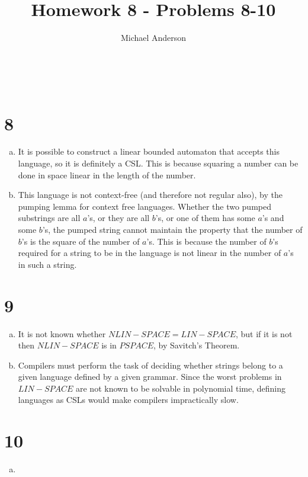 \documentclass{article}
\author{Michael Anderson}
\title{Homework 8 - Problems 8-10}
\begin{document}
\maketitle
{}
\\
\flushleft
\newpage

\section{8}
\begin{enumerate}[a)]
\item
It is possible to construct a linear bounded automaton that accepts this
language, so it is definitely a CSL. This is because squaring a number can be
done in space linear in the length of the number.

\item
This language is not context-free (and therefore not regular also), by the
pumping lemma for context free languages. Whether the two pumped substrings are 
all
$a$'s, or they are all $b$'s, or one of them has some $a$'s and some $b$'s,
the pumped string cannot maintain the property that the number of
$b$'s is the square of the number of $a$'s. This is because the number of $b$'s 
required for a string to be in the language is not linear in the number of $a$'s
in such a string.

\end{enumerate}

\section{9}
\begin{enumerate}[a)]
\item
It is not known whether $NLIN-SPACE=LIN-SPACE$, but if it is not then
$NLIN-SPACE$ is in $PSPACE$, by Savitch's Theorem.

\item
Compilers must perform the task of deciding whether strings belong to a given
language defined by a given grammar. Since the worst problems in $LIN-SPACE$
are
not known to be solvable in polynomial time, defining languages as CSLs would
make compilers impractically slow.
\end{enumerate}

\section{10}
\begin{enumerate}[a)]
\item

\end{enumerate}
\end{document}

